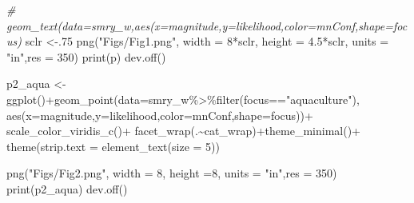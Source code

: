 \documentclass[
]{article}
\newenvironment{Shaded}{\begin{snugshade}}{\end{snugshade}}
\newcommand{\AttributeTok}[1]{\textcolor[rgb]{0.77,0.63,0.00}{#1}}
\newcommand{\CommentTok}[1]{\textcolor[rgb]{0.56,0.35,0.01}{\textit{#1}}}
\newcommand{\DecValTok}[1]{\textcolor[rgb]{0.00,0.00,0.81}{#1}}
\newcommand{\FloatTok}[1]{\textcolor[rgb]{0.00,0.00,0.81}{#1}}
\newcommand{\FunctionTok}[1]{\textcolor[rgb]{0.00,0.00,0.00}{#1}}
\newcommand{\NormalTok}[1]{#1}
\newcommand{\OtherTok}[1]{\textcolor[rgb]{0.56,0.35,0.01}{#1}}
\newcommand{\SpecialCharTok}[1]{\textcolor[rgb]{0.00,0.00,0.00}{#1}}
\newcommand{\StringTok}[1]{\textcolor[rgb]{0.31,0.60,0.02}{#1}}
\begin{document}
\begin{Shaded}
\begin{Highlighting}[]
    \CommentTok{\# geom\_text(data=smry\_w,aes(x=magnitude,y=likelihood,color=mnConf,shape=focus)}
\NormalTok{    sclr }\OtherTok{\textless{}{-}}\NormalTok{.}\DecValTok{75}
    \FunctionTok{png}\NormalTok{(}\StringTok{"Figs/Fig1.png"}\NormalTok{, }\AttributeTok{width =} \DecValTok{8}\SpecialCharTok{*}\NormalTok{sclr, }\AttributeTok{height =} \FloatTok{4.5}\SpecialCharTok{*}\NormalTok{sclr, }\AttributeTok{units =} \StringTok{"in"}\NormalTok{,}\AttributeTok{res =} \DecValTok{350}\NormalTok{)}
    \FunctionTok{print}\NormalTok{(p)}
    \FunctionTok{dev.off}\NormalTok{()}
    
\NormalTok{    p2\_aqua }\OtherTok{\textless{}{-}} \FunctionTok{ggplot}\NormalTok{()}\SpecialCharTok{+}\FunctionTok{geom\_point}\NormalTok{(}\AttributeTok{data=}\NormalTok{smry\_w}\SpecialCharTok{\%\textgreater{}\%}\FunctionTok{filter}\NormalTok{(focus}\SpecialCharTok{==}\StringTok{"aquaculture"}\NormalTok{),}
                            \FunctionTok{aes}\NormalTok{(}\AttributeTok{x=}\NormalTok{magnitude,}\AttributeTok{y=}\NormalTok{likelihood,}\AttributeTok{color=}\NormalTok{mnConf,}\AttributeTok{shape=}\NormalTok{focus))}\SpecialCharTok{+}
      \FunctionTok{scale\_color\_viridis\_c}\NormalTok{()}\SpecialCharTok{+}
      \FunctionTok{facet\_wrap}\NormalTok{(.}\SpecialCharTok{\textasciitilde{}}\NormalTok{cat\_wrap)}\SpecialCharTok{+}\FunctionTok{theme\_minimal}\NormalTok{()}\SpecialCharTok{+} \FunctionTok{theme}\NormalTok{(}\AttributeTok{strip.text =} \FunctionTok{element\_text}\NormalTok{(}\AttributeTok{size =} \DecValTok{5}\NormalTok{))}
       
    \FunctionTok{png}\NormalTok{(}\StringTok{"Figs/Fig2.png"}\NormalTok{, }\AttributeTok{width =} \DecValTok{8}\NormalTok{, }\AttributeTok{height =}\DecValTok{8}\NormalTok{, }\AttributeTok{units =} \StringTok{"in"}\NormalTok{,}\AttributeTok{res =} \DecValTok{350}\NormalTok{)}
    \FunctionTok{print}\NormalTok{(p2\_aqua)}
    \FunctionTok{dev.off}\NormalTok{()}
    

\end{Highlighting}
\end{Shaded}
\end{document}
